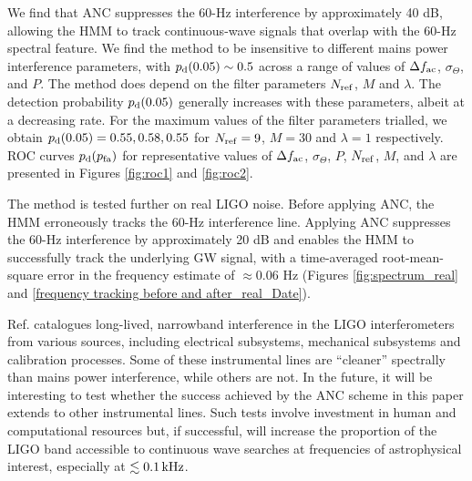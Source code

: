 \documentclass[pra,superscriptaddress,reprint,amsmath,amssymb,nofootinbib]{revtex4-2}
\begin{document}
We find that ANC suppresses the 60-Hz interference by approximately 40 dB, allowing the HMM to track continuous-wave signals that overlap with the 60-Hz spectral feature. We find the method to be insensitive to different mains power interference parameters, with $p_{\rm d}(0.05) \sim 0.5$ across a range of values of $\Delta f_{\rm ac}$, $\sigma_\Theta$, and $P$. The method does depend on the filter parameters $N_{\rm ref}$, $M$ and $\lambda$. The detection probability $p_{\rm d}(0.05)$ generally increases with these parameters, albeit at a decreasing rate. For the maximum values of the filter parameters trialled, we obtain $p_{\rm d}(0.05) = 0.55, 0.58,0.55$ for $N_{\rm ref} = 9$, $M=30$ and $\lambda=1$ respectively. ROC curves $p_{\rm d}(p_{\rm fa})$ for representative values of $\Delta f_{\rm ac}$, $\sigma_\Theta$, $P$, $N_{\rm ref}$, $M$, and $\lambda$ are presented in Figures \ref{fig:roc1} and \ref{fig:roc2}. \newline 

The method is tested further on real LIGO noise. Before applying ANC, the HMM erroneously tracks the 60-Hz interference line. Applying ANC suppresses the 60-Hz interference by approximately 20 dB and enables the HMM to successfully track the underlying GW signal, with a time-averaged root-mean-square error in the frequency estimate of $\approx 0.06$ Hz (Figures \ref{fig:spectrum_real}  and \ref{frequency tracking before and after_real_Date}). \newline 


Ref. \cite{CovasEtAl:2018} catalogues long-lived, narrowband interference in the LIGO interferometers from various sources, including electrical subsystems, mechanical subsystems and calibration processes. Some of these instrumental lines are ``cleaner'' spectrally than mains power interference, while others are not. In the future, it will be interesting to test whether the success achieved by the ANC scheme in this paper extends to other instrumental lines. Such tests involve investment in human and computational resources but, if successful, will increase the proportion of the LIGO band accessible to continuous wave searches at frequencies of astrophysical interest, especially at $\lesssim 0.1 \, {\rm kHz}$.



%


\end{document}
